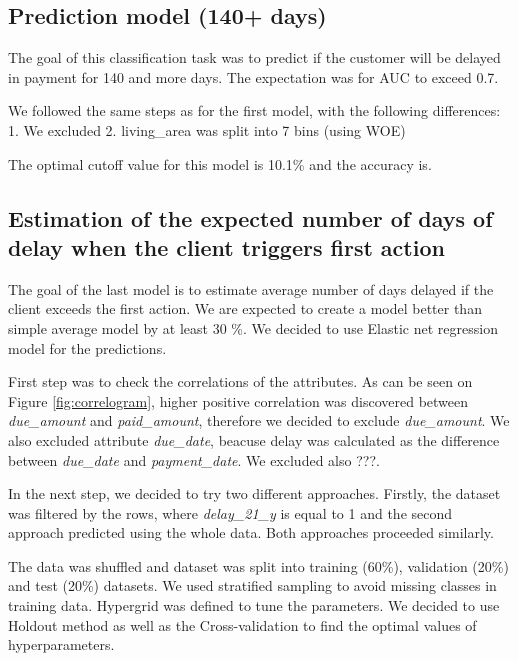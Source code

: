 \documentclass[
]{article}
\begin{document}
\hypertarget{prediction-model-140-days}{%
\subsection{Prediction model (140+ days)}\label{prediction-model-140-days}}

The goal of this classification task was to predict if the customer will be delayed in payment for 140 and more days. The expectation was for AUC to exceed 0.7.

We followed the same steps as for the first model, with the following differences:
1. We excluded
2. living\_area was split into 7 bins (using WOE)

The optimal cutoff value for this model is 10.1\% and the accuracy is.

\hypertarget{estimation-of-the-expected-number-of-days-of-delay-when-the-client-triggers-first-action}{%
\subsection{Estimation of the expected number of days of delay when the client triggers first action}\label{estimation-of-the-expected-number-of-days-of-delay-when-the-client-triggers-first-action}}

The goal of the last model is to estimate average number of days delayed if the client exceeds the first action.
We are expected to create a model better than simple average model by at least 30 \%. We decided to use
Elastic net regression model for the predictions.

First step was to check the correlations of the attributes. As can be seen on Figure \ref{fig:correlogram}, higher positive correlation was discovered between \emph{due\_amount} and \emph{paid\_amount}, therefore we decided to exclude \emph{due\_amount}. We also excluded attribute \emph{due\_date}, beacuse delay was calculated as the difference between \emph{due\_date} and \emph{payment\_date}.
We excluded also ???.

In the next step, we decided to try two different approaches. Firstly, the dataset was filtered by the rows, where \emph{delay\_21\_y} is equal to 1 and the second approach predicted using the whole data. Both approaches proceeded similarly.

The data was shuffled and dataset was split into training (60\%), validation (20\%) and test (20\%) datasets. We used stratified sampling to avoid missing classes in training data. Hypergrid was defined to tune the parameters. We decided to use Holdout method as well as the Cross-validation to find the optimal values of hyperparameters.
\end{document}
